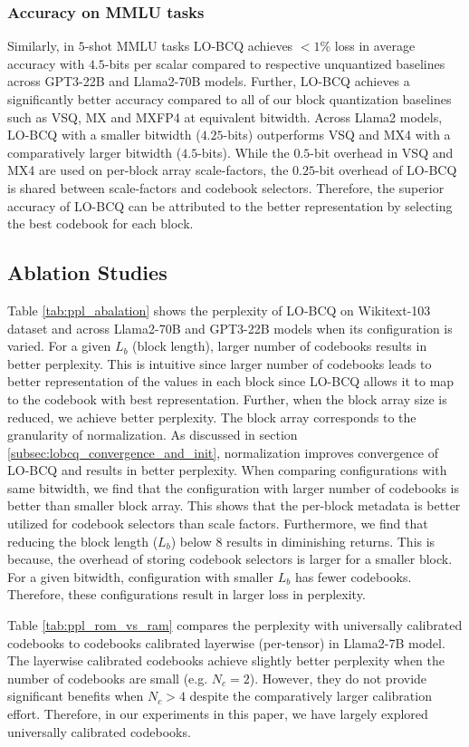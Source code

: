 \subsubsection{Accuracy on MMLU tasks}
Similarly, in $5$-shot MMLU tasks LO-BCQ achieves $<1$\% loss in average accuracy with $4.5$-bits per scalar compared to respective unquantized baselines across GPT3-22B and Llama2-70B models. Further, LO-BCQ achieves a significantly better accuracy compared to all of our block quantization baselines such as VSQ, MX and MXFP4 at equivalent bitwidth. Across Llama2 models, LO-BCQ with a smaller bitwidth ($4.25$-bits) outperforms VSQ and MX4 with a comparatively larger bitwidth ($4.5$-bits). While the $0.5$-bit overhead in VSQ and MX4 are used on per-block array scale-factors, the $0.25$-bit overhead of LO-BCQ is shared between scale-factors and codebook selectors. Therefore, the superior accuracy of LO-BCQ can be attributed to the better representation by selecting the best codebook for each block.

\subsection{Ablation Studies}
Table \ref{tab:ppl_abalation} shows the perplexity of LO-BCQ on Wikitext-103 dataset and across Llama2-70B and GPT3-22B models when its configuration is varied. For a given $L_b$ (block length), larger number of codebooks results in better perplexity. This is intuitive since larger number of codebooks leads to better representation of the values in each block since LO-BCQ allows it to map to the codebook with best representation. Further, when the block array size is reduced, we achieve better perplexity. The block array corresponds to the granularity of normalization. As discussed in section \ref{subsec:lobcq_convergence_and_init}, normalization improves convergence of LO-BCQ and results in better perplexity. When comparing configurations with same bitwidth, we find that the configuration with larger number of codebooks is better than smaller block array. This shows that the per-block metadata is better utilized for codebook selectors than scale factors. Furthermore, we find that reducing the block length ($L_b$) below $8$ results in diminishing returns. This is because, the overhead of storing codebook selectors is larger for a smaller block. For a given bitwidth, configuration with smaller $L_b$ has fewer codebooks. Therefore, these configurations result in larger loss in perplexity.

Table \ref{tab:ppl_rom_vs_ram} compares the perplexity with universally calibrated codebooks to codebooks calibrated layerwise (per-tensor) in Llama2-7B model. The layerwise calibrated codebooks achieve slightly better perplexity when the number of codebooks are small (e.g. $N_c=2$). However, they do not provide significant benefits when $N_c>4$ despite the comparatively larger calibration effort. Therefore, in our experiments in this paper, we have largely explored universally calibrated codebooks. 